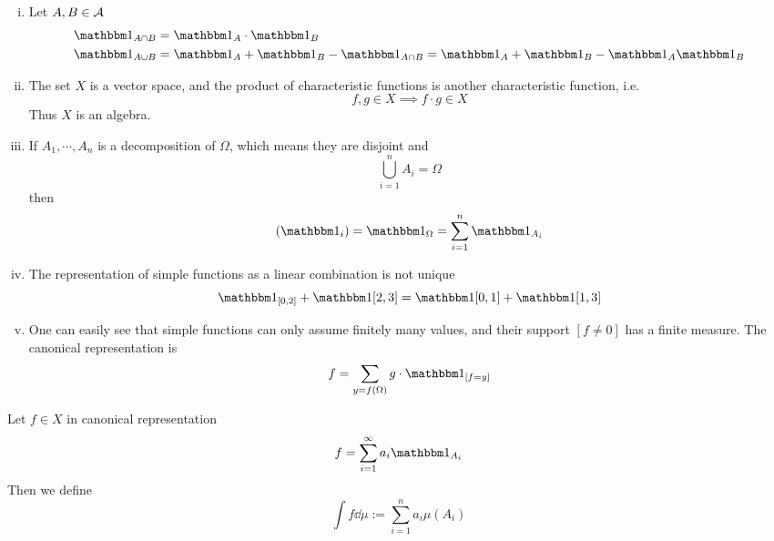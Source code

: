 \documentclass[../../script.tex]{subfiles}
\begin{document}
\begin{rem}
    \begin{enumerate}[(i)]
        \item Let $A, B \in \mathcal{A}$
        \begin{align*}
            \charfun_{A \cap B} &= \charfun_A \cdot \charfun_B \\
            \charfun_{A \cup B} &= \charfun_A + \charfun_B - \charfun_{A \cap B} = \charfun_A + \charfun_B - \charfun_A \charfun_B
        \end{align*}

        \item The set $X$ is a vector space, and the product of characteristic functions is another characteristic function, i.e.
        \[
            f, g \in X \implies f \cdot g \in X
        \]
        Thus $X$ is an algebra.

        \item If $A_1, \cdots, A_n$ is a decomposition of $\Omega$, which means they are disjoint and 
        \[
            \bigcup_{i=1}^n A_i = \Omega
        \]
        then 
        \[
            (\charfun_i) = \charfun_{\Omega} = \sum_{i=1}^n \charfun_{A_i}
        \]

        \item The representation of simple functions as a linear combination is not unique
        \[
            \charfun_{[0, 2]} + \charfun{[2, 3]} = \charfun{[0, 1]} + \charfun{[1, 3]}
        \]

        \item One can easily see that simple functions can only assume finitely many values, and their support $[f \ne 0]$ has a finite measure.
        The canonical representation is 
        \[
            f = \sum_{y = f(\Omega)} g \cdot \charfun_{[f = y]}
        \]
    \end{enumerate}
\end{rem}

\begin{defi}
    Let $f \in X$ in canonical representation 
    \[
        f = \sum_{i=1}^{\infty} a_i \charfun_{A_i}
    \]
    Then we define 
    \[
        \int f \dd{\mu} := \sum_{i=1}^n a_i \mu(A_i)
    \]
\end{defi}
\end{document}
